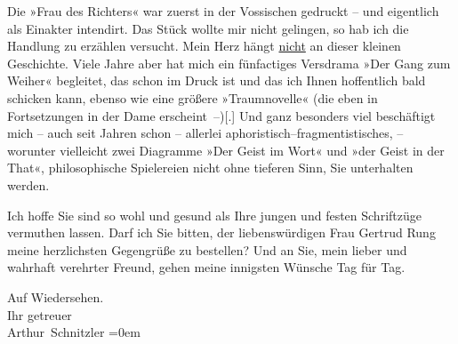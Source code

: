 \pstart
           Die »Frau des Richters« war zuerst in der Vossischen gedruckt – und eigentlich als Einakter
               intendirt. Das Stück wollte mir nicht gelingen, so hab ich die Handlung zu erzählen
               versucht. Mein Herz hängt \uline{nicht} an dieser kleinen
               Geschichte. Viele Jahre aber hat mich ein fünfactiges Versdrama »Der Gang zum Weiher« begleitet, das schon im Druck ist und das
               ich Ihnen hoffentlich bald schicken kann, ebenso wie eine größere »Traumnovelle« (die eben in Fortsetzungen in der
                  Dame erscheint –){[}.{]}{ }{\pb}Und ganz besonders viel beschäftigt mich – auch
               seit Jahren schon – allerlei aphoristisch–fragmentistisches, – worunter vielleicht
               zwei Diagramme »Der Geist im Wort« und »der Geist in
                  der That«, philosophische Spielereien nicht ohne tieferen Sinn, Sie
               unterhalten werden.\pend
           
\pstart
           Ich hoffe Sie sind so wohl und gesund als Ihre jungen und festen Schriftzüge
               vermuthen lassen. Darf ich Sie bitten, der liebenswürdigen Frau Gertrud Rung meine herzlichsten Gegengrüße zu bestellen? Und an
               Sie, mein lieber und wahrhaft verehrter Freund, gehen meine innigsten Wünsche {\pb}Tag für Tag.\pend
           
\pstart
           Auf Wiedersehen.{\\[\baselineskip]}Ihr getreuer{\\[\baselineskip]}\spacefill\mbox{Arthur Schnitzler}\pend
           \leftskip=0em{}\endnumbering{}  
      